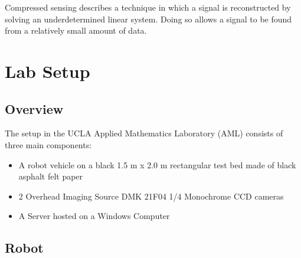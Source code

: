 \documentclass[english]{article}\usepackage[]{graphicx}\usepackage[]{color}
\begin{document}
Compressed sensing describes a technique in which a signal is reconstructed by solving an underdetermined linear system. Doing so allows a signal to be found from a relatively small amount of data. 

\section{Lab Setup}
\subsection{Overview}
The setup in the UCLA Applied Mathematics Laboratory (AML) consists of three main components: 

\begin{itemize}
\item A robot vehicle on a black 1.5 m x 2.0 m rectangular test bed made of black asphalt felt paper
\item 2 Overhead Imaging Source DMK 21F04 1/4 Monochrome CCD cameras
\item A Server hosted on a Windows Computer
\end{itemize}

\subsection{Robot}
\end{document}
